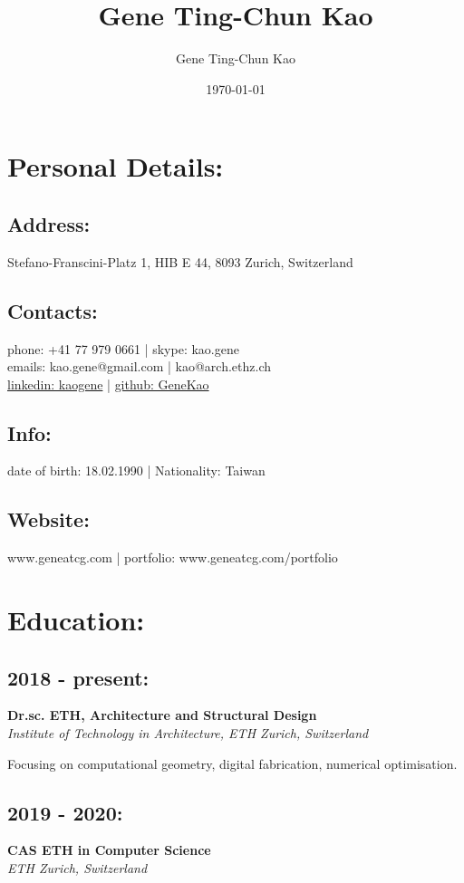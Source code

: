\documentclass[a4paper, 9pt]{article}
\author{Gene Ting-Chun Kao}
\date{\today}
\title{Gene Ting-Chun Kao}
\begin{document}
\maketitle





\section{Personal Details:}
\label{sec:org1848a1d}
\subsection{Address:}
\label{sec:org9a29ceb}
Stefano-Franscini-Platz 1, HIB E 44, 8093 Zurich, Switzerland
\subsection{Contacts:}
\label{sec:org8621098}
phone:  +41 77 979 0661    | skype: kao.gene \\
emails: kao.gene@gmail.com | kao@arch.ethz.ch \\
\href{https://www.linkedin.com/in/kaogene/}{linkedin: kaogene} | \href{https://github.com/GeneKao}{github: GeneKao}
\subsection{Info:}
\label{sec:orgbe7ab17}
date of birth: 18.02.1990 | Nationality: Taiwan
\subsection{Website:}
\label{sec:org4191948}
www.geneatcg.com | portfolio: www.geneatcg.com/portfolio
\section{Education:}
\label{sec:orgc956930}
\subsection{2018 - present:}
\label{sec:org6a81eda}
\textbf{Dr.sc. ETH, Architecture and Structural Design} \\
\emph{Institute of Technology in Architecture, ETH Zurich, Switzerland}

Focusing on computational geometry, digital fabrication, numerical optimisation. 

\subsection{2019 - 2020:}
\label{sec:orgceeccab}
\textbf{CAS ETH in Computer Science} \\
\emph{ETH Zurich, Switzerland}
\end{document}
